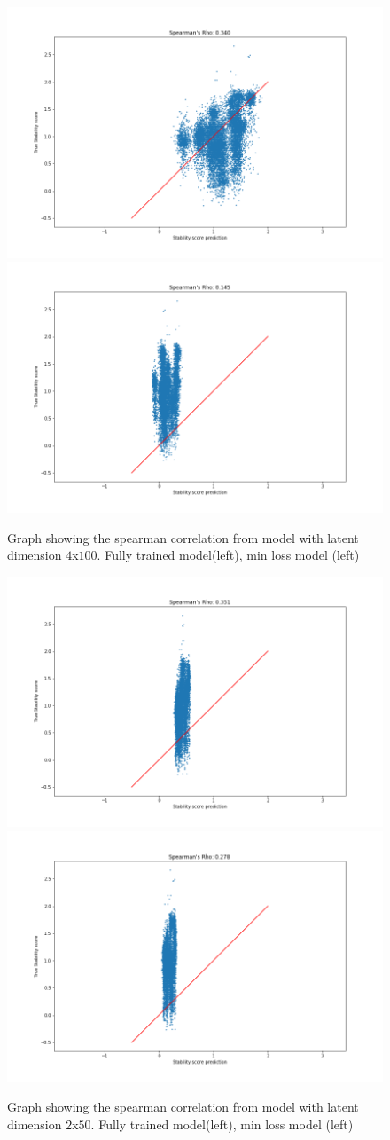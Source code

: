 \begin{figure}[!ht]
  \centering
  \includegraphics[width=0.4\linewidth]{latex/imgs/CNN_spearman_correlation_100_fully.png}
  \includegraphics[width=0.4\linewidth]{latex/imgs/CNN_spearman_correlation_100_best.png}
  \caption{Graph showing the spearman correlation from model with latent dimension $4$x$100$. Fully trained model(left), min loss model (left)}
  \label{fig:stab_100}
\end{figure}

\begin{figure}[!ht]
  \centering
  \includegraphics[width=0.4\linewidth]{latex/imgs/CNN_spearman_correlation_50_fully.png}
  \includegraphics[width=0.4\linewidth]{latex/imgs/CNN_spearman_correlation_50_best.png}
  \caption{Graph showing the spearman correlation from model with latent dimension $2$x$50$. Fully trained model(left), min loss model (left)}
  \label{fig:stab_50}
\end{figure}
